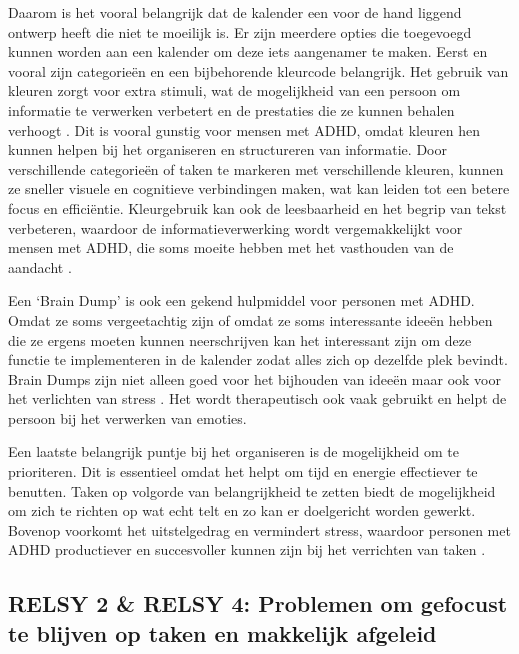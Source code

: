Daarom is het vooral belangrijk dat de kalender een voor de hand liggend ontwerp heeft die niet te moeilijk is. Er zijn meerdere opties die toegevoegd kunnen worden aan een kalender om deze iets aangenamer te maken. Eerst en vooral zijn categorieën en een bijbehorende kleurcode belangrijk.   Het gebruik van kleuren zorgt voor extra stimuli, wat de mogelijkheid van een persoon om informatie te verwerken verbetert en de prestaties die ze kunnen behalen verhoogt \autocite{zentall1985information}.  Dit is vooral gunstig voor mensen met ADHD, omdat kleuren hen kunnen helpen bij het organiseren en structureren van informatie. Door verschillende categorieën of taken te markeren met verschillende kleuren, kunnen ze sneller visuele en cognitieve verbindingen maken, wat kan leiden tot een betere focus en efficiëntie. Kleurgebruik kan ook de leesbaarheid en het begrip van tekst verbeteren, waardoor de informatieverwerking wordt vergemakkelijkt voor mensen met ADHD, die soms moeite hebben met het vasthouden van de aandacht \autocite{zentall1986performance}. \newline

Een ‘Brain Dump’ is ook een gekend hulpmiddel voor personen met ADHD. Omdat ze soms vergeetachtig zijn of omdat ze soms interessante ideeën hebben die ze ergens moeten kunnen neerschrijven \autocite{allen2023chaostoclarity} kan het interessant zijn om deze functie te implementeren in de kalender zodat alles zich op dezelfde plek bevindt. Brain Dumps zijn niet alleen goed voor het bijhouden van ideeën maar ook voor het verlichten van stress \autocite{wisner2023braindump}. Het wordt therapeutisch ook vaak gebruikt en helpt de persoon bij het verwerken van emoties. \newline

Een laatste belangrijk puntje bij het organiseren is de mogelijkheid om te prioriteren. Dit is essentieel omdat het helpt om tijd en energie effectiever te benutten. Taken op volgorde van belangrijkheid te zetten biedt de mogelijkheid om zich te richten op wat echt telt en zo kan er doelgericht worden gewerkt. Bovenop voorkomt het uitstelgedrag en vermindert stress, waardoor personen met ADHD productiever en succesvoller kunnen zijn bij het verrichten van taken \autocite{ramsay2024cbt}.

\subsection{RELSY 2 \& RELSY 4: Problemen om gefocust te blijven op taken en makkelijk afgeleid}

